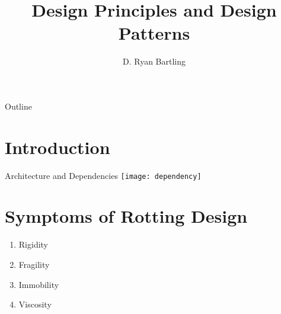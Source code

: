 \documentclass[xcolor=svgnames]{beamer}
\title
    [Design Principles\hspace{2em}]
    {Design Principles and Design Patterns}
\author
    [Ryan Bartling]
    {D. Ryan Bartling}
\begin{document}

\maketitle

\setcounter{tocdepth}{1}
\begin{frame}{Outline}
    \tableofcontents
\end{frame}


\section{Introduction}


\begin{frame}{Architecture and Dependencies}
    \centering
    \texttt{[image: dependency]}
\end{frame}


\section[Rotting Code]{Symptoms of Rotting Design}


\begin{frame}{\secname}
    \begin{enumerate}
        \pause \item Rigidity %
        \pause \item Fragility %
        \pause \item Immobility %
        \pause \item Viscosity %
    \end{enumerate}
\end{frame}
\end{document}
